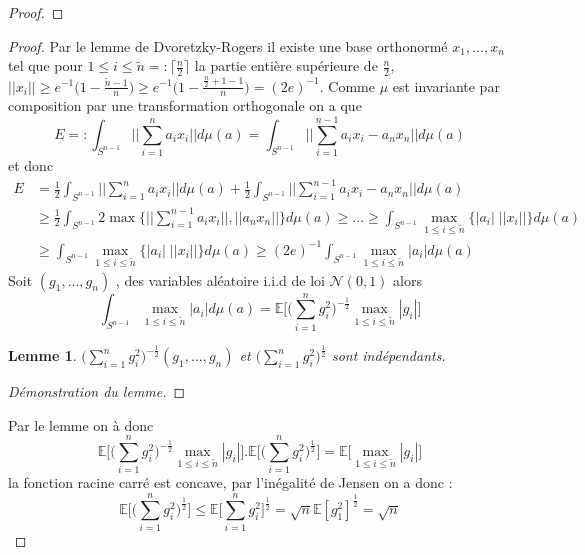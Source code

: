 \documentclass[12pt]{article}
\newtheorem{lemme}{Lemme}[section]
\newtheorem{proposition}{Proposition}[section]
\newcommand{\boxXx}[1]{\medskip\noindent\fbox{\begin{minipage}{\textwidth}\vspace{2pt}#1\vspace{2pt}\end{minipage}}\medskip}
\begin{document}
\begin{proof}
\end{proof}

\boxXx{
	\begin{proposition}[Estimation de $E$]\label{esE}
		Il existe $c>0$ tel que $E \geq c \sqrt{\frac{\log n}{n}}$.
	\end{proposition}
}
\begin{proof}
	Par le lemme de Dvoretzky-Rogers il existe une base orthonormé $x_1,...,x_n$ tel que pour $1\leq i \leq \tilde{n}=:\big\lceil\frac{n}{2}\big\rceil$ la partie entière supérieure de $\frac{n}{2}$, $||x_i||\geq e^{-1}\Big(1-\frac{\tilde{n} -1}{n}\Big)\geq e^{-1}\Big(1-\frac{\frac{n}{2}+1 -1}{n}\Big)= (2e)^{-1}$. Comme $\mu$ est invariante par composition par une transformation orthogonale on a que  
	\begin{equation*}
		E=:\int_{S^{n-1}} ||\sum_{i=1}^{n}a_ix_i||d\mu(a)= \int_{S^{n-1}} ||\sum_{i=1}^{n-1}a_ix_i-a_nx_n||d\mu(a)
	\end{equation*}
	et donc 
	\begin{align*}
		E&=\frac{1}{2}\int_{S^{n-1}} ||\sum_{i=1}^{n}a_ix_i||d\mu(a)+ \frac{1}{2}\int_{S^{n-1}} ||\sum_{i=1}^{n-1}a_ix_i-a_nx_n||d\mu(a)\\
		&\geq\frac{1}{2}\int_{S^{n-1}} 2\max\Big\{||\sum_{i=1}^{n-1}a_ix_i||,||a_nx_n||\Big\}d\mu(a)\geq ...\geq \int_{S^{n-1}} \max_{1\leq i \leq \tilde{n}}\Big\{|a_i|\;||x_i||\Big\}d\mu(a)\\
		&\geq \int_{S^{n-1}} \max_{1\leq i \leq \tilde{n}}\Big\{|a_i|\;||x_i||\Big\}d\mu(a) \geq (2e)^{-1}\int_{S^{n-1}} \max_{1\leq i \leq \tilde{n}}|a_i| d\mu(a)	
	\end{align*}
	Soit $(g_1,...,g_n)$ , des variables aléatoire i.i.d de loi $\mathcal{N}(0,1)$ alors 
	\begin{equation*}
		\int_{S^{n-1}} \max_{1\leq i \leq \tilde{n}}|a_i| d\mu(a) =\mathbb{E}\Big[\big(\sum_{i=1}^{n}g_i^2\big)^{-\frac{1}{2}} \max_{1\leq i \leq \tilde{n}}|g_i|\Big]
	\end{equation*}
	\begin{lemme}
		$\big(\sum_{i=1}^{n}g_i^2\big)^{-\frac{1}{2}}(g_1,...,g_n)$ et $\big(\sum_{i=1}^{n}g_i^2\big)^{\frac{1}{2}}$ sont indépendants.
	\end{lemme}
	\begin{proof}[\color{red}Démonstration du lemme]
	\end{proof}
	\color{black}
	Par le lemme on à donc 
	\begin{equation*}
		\mathbb{E}\Big[\big(\sum_{i=1}^{n}g_i^2\big)^{-\frac{1}{2}} \max_{1\leq i \leq \tilde{n}}|g_i|\Big] . \mathbb{E}\Big[\big(\sum_{i=1}^{n}g_i^2\big)^{\frac{1}{2}}\Big] = \mathbb{E}\big[\max_{1\leq i \leq \tilde{n}}|g_i|\big]
	\end{equation*}
	la fonction racine carré est concave, par l'inégalité de Jensen on a donc :
	\begin{equation*}
		\mathbb{E}\big[\big(\sum_{i=1}^{n}g_i^2\big)^{\frac{1}{2}}\big]\leq \mathbb{E}\big[\sum_{i=1}^{n}g_i^2\big]^{\frac{1}{2}}= \sqrt{n} \mathbb{E}[g_1^2]^{\frac{1}{2}}=\sqrt{n} 
	\end{equation*}


\end{proof}
\end{document}
